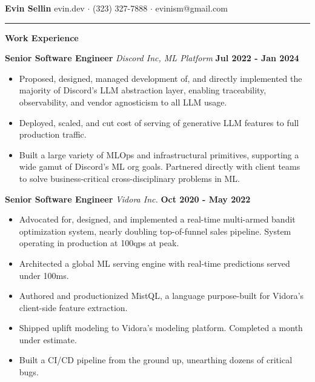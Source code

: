 \documentclass[10pt]{letter}
\begin{document}
\textbf{Evin Sellin}
\hfill
evin.dev $\cdot$ (323) 327-7888 $\cdot$ evinism@gmail.com
\vspace{4px}
\hrule
\textbf{Work Experience}

\hspace*{2px}
\textbf{Senior Software Engineer}
\textit{Discord Inc, ML Platform}
\hfill 
\textbf{Jul 2022 - Jan 2024}
\begin{itemize}
  \item Proposed, designed, managed development of, and directly implemented the majority of Discord's LLM abstraction layer, enabling traceability, observability, and vendor agnosticism to all LLM usage.
  \item Deployed, scaled, and cut cost of serving of generative LLM features to full production traffic.
  \item Built a large variety of MLOps and infrastructural primitives, supporting a wide gamut of Discord's ML org goals. Partnered directly with client teams to solve business-critical cross-disciplinary problems in ML.
\end{itemize}

\hspace*{2px}
\textbf{Senior Software Engineer} 
\textit{Vidora Inc.}
\hfill 
\textbf{Oct 2020 - May 2022}
\begin{itemize}
  \item Advocated for, designed, and implemented a real-time multi-armed bandit optimization system, nearly doubling top-of-funnel sales pipeline. System operating in production at 100qps at peak.
  \item Architected a global ML serving engine with real-time predictions served under 100ms.
  \item Authored and productionized MistQL, a language purpose-built for Vidora's client-side feature extraction.
  \item Shipped uplift modeling to Vidora's modeling platform. Completed a month under estimate.
  \item Built a CI/CD pipeline from the ground up, unearthing dozens of critical bugs.
\end{itemize}
\end{document}
